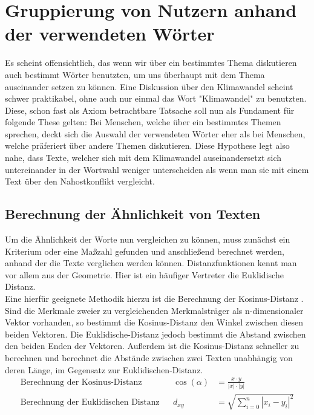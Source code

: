\chapter{Gruppierung von Nutzern anhand der verwendeten Wörter }
\label{chap:cluster_hashtags}
Es scheint offensichtlich, das wenn wir über ein bestimmtes Thema diskutieren auch bestimmt Wörter benutzten, um uns überhaupt mit dem Thema auseinander setzen zu können. Eine Diskussion über den Klimawandel scheint schwer praktikabel, ohne auch nur einmal das Wort "{}Klimawandel"{} zu benutzten. Diese, schon fast als Axiom betrachtbare Tatsache soll nun als Fundament für folgende These gelten: Bei Menschen, welche über ein bestimmtes Themen sprechen, deckt sich die Auswahl der verwendeten Wörter eher als bei Menschen, welche präferiert über andere Themen diskutieren. Diese Hypothese legt also nahe, dass Texte, welcher sich mit dem Klimawandel auseinandersetzt sich untereinander in der Wortwahl weniger unterscheiden als wenn man sie mit einem Text über den Nahostkonflikt vergleicht.

\section{Berechnung der Ähnlichkeit von Texten}
\label{chap:berechnung_texteahnlichkeit}
Um die Ähnlichkeit der Worte nun vergleichen zu können, muss zunächst ein Kriterium oder eine Maßzahl gefunden und anschließend berechnet werden, anhand der die Texte verglichen werden können. Distanzfunktionen kennt man vor allem aus der Geometrie. Hier ist ein häufiger Vertreter die Euklidische Distanz. \\ \newline
Eine hierfür geeignete Methodik hierzu ist die Berechnung der Kosinus-Distanz . Sind die Merkmale zweier zu vergleichenden Merkmalsträger als n-dimensionaler Vektor vorhanden, so bestimmt die Kosinus-Distanz den Winkel zwischen diesen beiden Vektoren. Die Euklidische-Distanz jedoch  bestimmt die Abstand zwischen den beiden Enden der Vektoren. Außerdem ist die Kosinus-Distanz schneller zu berechnen und berechnet die Abstände zwischen zwei Texten unabhängig von deren Länge, im Gegensatz zur Euklidischen-Distanz.
\begin{equation}
	\begin{aligned} 
		\text{Berechnung der Kosinus-Distanz}&& 
		\cos(\alpha)&=\frac{x\cdot y}{\left|x\right|\cdot \left|y\right|} \\
		\text{Berechnung der Euklidischen Distanz}&& 
		{d}_{xy}&=\sqrt{\sum _{i=0}^{n}{\left|{x}_{i}-{y}_{i}\right|}^{2}} \\  
	\end{aligned} 
	\label{eq:distance}
\end{equation}

